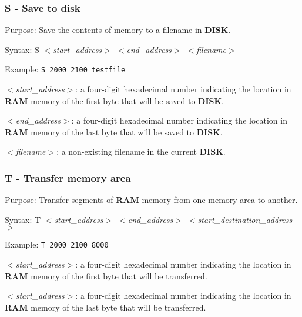         \subsubsection{S - Save to disk}

        Purpose: Save the contents of memory to a filename in \textbf{DISK}.

        Syntax: S \textit{$<$start\_address$>$ $<$end\_address$>$ $<$filename$>$}

        Example: \texttt{S 2000 2100 testfile}

        \hspace{1cm}\textit{$<$start\_address$>$}: a four-digit hexadecimal
        number indicating the location in \textbf{RAM} memory of the first byte
        that will be saved to \textbf{DISK}.

        \hspace{1cm}\textit{$<$end\_address$>$}: a four-digit hexadecimal
        number indicating the location in \textbf{RAM} memory of the last byte
        that will be saved to \textbf{DISK}.

        \hspace{1cm}\textit{$<$filename$>$}: a non-existing filename in the
        current \textbf{DISK}.

        \subsubsection{T - Transfer memory area}

        Purpose: Transfer segments of \textbf{RAM} memory from one memory area
        to another.

        Syntax: T \textit{$<$start\_address$>$ $<$end\_address$>$
        $<$start\_destination\_address$>$}

        Example: \texttt{T 2000 2100 8000}

        \hspace{1cm}\textit{$<$start\_address$>$}: a four-digit hexadecimal
        number indicating the location in \textbf{RAM} memory of the first byte
        that will be transferred.

        \hspace{1cm}\textit{$<$start\_address$>$}: a four-digit hexadecimal
        number indicating the location in \textbf{RAM} memory of the last byte
        that will be transferred.

